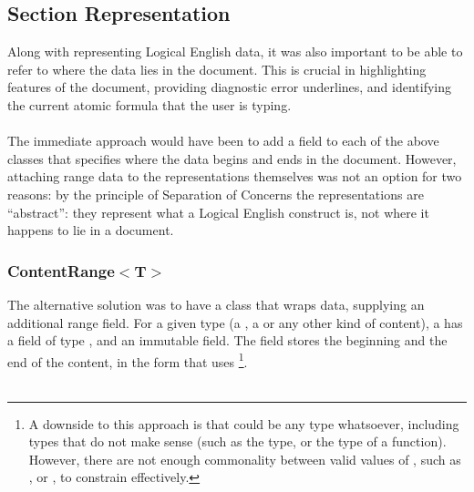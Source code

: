 \documentclass[../main.tex]{subfiles}
\begin{document}
\subsection{Section Representation}
Along with representing Logical English data, it was also important to be able to refer to where the data lies in the document. This is crucial in highlighting features of the document, providing diagnostic error underlines, and identifying the current atomic formula that the user is typing. 
\\
\\
The immediate approach would have been to add a  field to each of the above classes that specifies where the data begins and ends in the document. However, attaching range data to the representations themselves was not an option for two reasons: by the principle of Separation of Concerns \cite[p.~183]{software_handbook_soc} the representations are ``abstract'': they represent what a Logical English construct is, not where it happens to lie in a document. 

\subsubsection{ContentRange$<$T$>$}
The alternative solution was to have a class that wraps data, supplying an additional range field. For a given type  (a , a  or any other kind of content), a  has a  field of type , and an immutable  field. 
The  field stores the beginning and the end of the content, in the  form that  uses \footnote{A downside to this approach is that  could be any type whatsoever, including types that do not make sense (such as the  type, or the type of a function). However, there are not enough commonality between valid values of , such as ,  or , to constrain  effectively.}.
\\
\\
\end{document}
